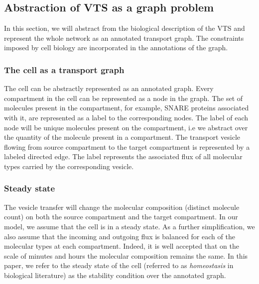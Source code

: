 \subsection{Abstraction of VTS as a graph problem}


\noindent In this section, we will abstract from the biological description of the VTS and represent the whole network as an annotated transport graph. 
%
The constraints imposed by cell biology are incorporated in the annotations of the graph. 

\subsubsection{The cell as a transport graph} 
The cell can be abstractly represented as an annotated graph. 
Every compartment in the cell can be represented as a node in the graph. 
%
The set of molecules present in the compartment, for example, SNARE proteins associated with it, are represented as a label to the corresponding nodes.
%
The label of each node will be unique molecules present on the compartment, i.e we abstract over the quantity of the molecule present in a compartment.
%
The transport vesicle flowing from source compartment to the target compartment is represented by a labeled directed edge. 
% 
The label represents the associated flux of all molecular types carried by the corresponding vesicle.
%
%

\subsubsection{Steady state} 
The vesicle transfer will change the molecular composition (distinct molecule count) on both the source compartment and the target compartment. 
%
In our model, we assume that the cell is in a steady state. As a further simplification, we also assume that the incoming and outgoing flux is balanced for each of the molecular types at each compartment. 
Indeed, it is well accepted that on the scale of minutes and hours the molecular composition remains the same. 
%
In this paper, we refer to the steady state of the cell (referred to as \textit{homeostasis} in biological literature) as the stability condition over the annotated graph.


